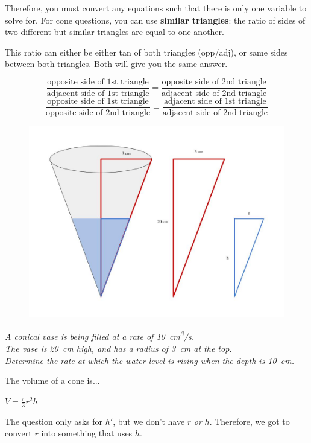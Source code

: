 \documentclass[a4paper,12pt]{article}
\begin{document}
Therefore, you must convert any equations such that there is only one variable to solve for. For cone questions, you can use \textbf{similar triangles}: the ratio of sides of two different but similar triangles are equal to one another.

This ratio can either be either tan of both triangles (opp/adj), or same sides between both triangles. Both will give you the same answer.

$$\frac{\textrm{opposite side of 1st triangle}}{\textrm{adjacent side of 1st triangle}} = \frac{\textrm{opposite side of 2nd triangle}}{\textrm{adjacent side of 2nd triangle}}$$
$$\frac{\textrm{opposite side of 1st triangle}}{\textrm{opposite side of 2nd triangle}} = \frac{\textrm{adjacent side of 1st triangle}}{\textrm{adjacent side of 2nd triangle}}$$

\begin{figure}[H]
    \centering
    \includegraphics[width=\textwidth]{cone}
\end{figure}

\emph{A conical vase is being filled at a rate of \SI{10}{\cm\cubed/\s}.\\The vase is \SI{20}{\cm} high, and has a radius of \SI{3}{\cm} at the top.\\Determine the rate at which the water level is rising when the depth is \SI{10}{\cm}.}

The volume of a cone is...

$V = \frac{\pi}{3}r^2h$

The question only asks for $h'$, but we don't have $r$ \emph{or} $h$. Therefore, we got to convert $r$ into something that uses $h$.
\end{document}
